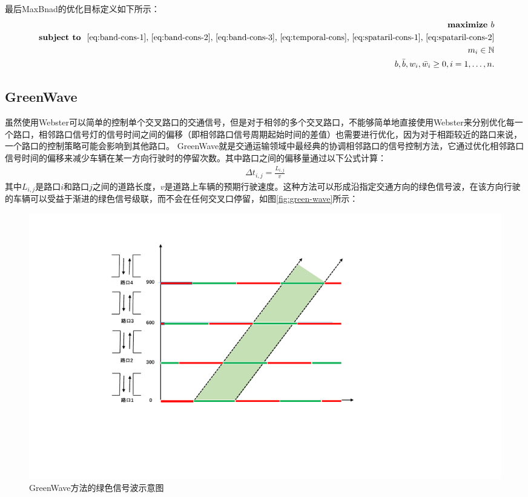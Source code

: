 最后MaxBnad的优化目标定义如下所示：
\begin{equation}
    \begin{split}
        \textbf { maximize } b \\
        \textbf { subject to } \text { \ref{eq:band-cons-1}, \ref{eq:band-cons-2}, \ref{eq:band-cons-3}, \ref{eq:temporal-cons}, \ref{eq:spataril-cons-1}, \ref{eq:spataril-cons-2}} \\
        {m_{i} \in \mathbb{N}} \\
        {b, \bar{b}, w_{i}, \bar{w}_{i} \geq 0, i=1, \ldots, n}.
    \end{split}
\end{equation}

\subsection{GreenWave}
虽然使用Webster可以简单的控制单个交叉路口的交通信号，但是对于相邻的多个交叉路口，不能够简单地直接使用Webster来分别优化每一个路口，相邻路口信号灯的信号时间之间的偏移（即相邻路口信号周期起始时间的差值）也需要进行优化，因为对于相距较近的路口来说，一个路口的控制策略可能会影响到其他路口。
GreenWave就是交通运输领域中最经典的协调相邻路口的信号控制方法，它通过优化相邻路口信号时间的偏移来减少车辆在某一方向行驶时的停留次数。其中路口之间的偏移量通过以下公式计算：
\begin{align}
    \label{eq:green-wave}
    \Delta t_{i, j}=\frac{L_{i, j}}{v}
\end{align}
其中$L_{i, j}$是路口$i$和路口$j$之间的道路长度，$v$是道路上车辆的预期行驶速度。这种方法可以形成沿指定交通方向的绿色信号波，在该方向行驶的车辆可以受益于渐进的绿色信号级联，而不会在任何交叉口停留，如图\autoref{fig:green-wave}所示：
\begin{figure}[htb]
    \includegraphics[width=1.2\textwidth]{fig/green-ware.pdf}
    \caption{GreenWave方法的绿色信号波示意图}
    \label{fig:green-wave}
\end{figure}

